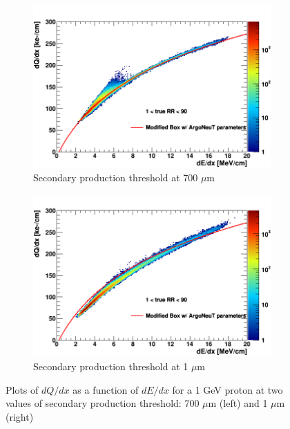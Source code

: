 \begin{figure}[bp!]
        \centering
        \begin{subfigure}[b]{0.495\textwidth}
            \centering
            \includegraphics[width=\textwidth]{proton_700um}
            \caption{Secondary production threshold at 700 $\mu$m}%
            \label{fig:proton_2d_700}
        \end{subfigure}
        \hfill
        \begin{subfigure}[b]{0.495\textwidth}  
            \centering 
            \includegraphics[width=\textwidth]{proton_1um}
            \caption{Secondary production threshold at 1 $\mu$m}%
            \label{fig:proton_2d_1}
        \end{subfigure}
        \caption{Plots of $dQ/dx$ as a function of $dE/dx$ for a 1 GeV proton at two values of secondary production threshold: 700 $\mu$m (left) and 1 $\mu$m (right)}
        \label{fig:proton_2d}
\end{figure}

